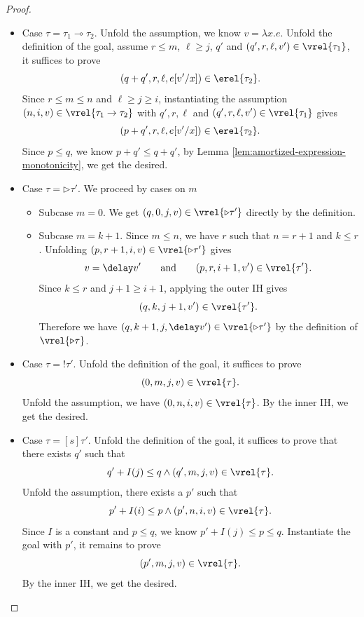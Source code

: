 \begin{proof}
\begin{itemize}
\begin{itemize}
\item {Subcase $v = \mathsf{inr}\,v_2$.}
The proof is symmetric to the first subcase.
\end{itemize}

\item Case $\tau = \tau_1\multimap\tau_2$.
Unfold the assumption, we know $v = \lambda x.e$. Unfold the definition of the goal, assume 
$r \leq m$, $\ell \geq j$, $q'$ and $(q',r, \ell, v') \in \vrel{\tau_1}$,
it suffices to prove 
\[(q+q',r, \ell, e[v'/x]) \in \erel{\tau_2}.\]
Since $r\leq m\leq n$ and $\ell\geq j\geq i$, instantiating the assumption $(n, i, v) \in \vrel{\tau_1 \to \tau_2}$ with
$q', r, \ell$ and $(q',r, \ell, v') \in \vrel{\tau_1}$ gives
\[(p+q',r, \ell, e[v'/x]) \in \erel{\tau_2}.\]
Since $p \leq q$, we know $p+q'\leq q+q'$, by Lemma \ref{lem:amortized-expression-monotonicity}, we get the desired.

\item Case $\tau=\triangleright\tau'$.
We proceed by cases on $m$

\begin{itemize}
\item {Subcase $m=0$.}
We get $(q, 0,j,v) \in \vrel{\triangleright\tau'}$ directly by the definition.

\item {Subcase $m=k+1$.}
Since $m \leq n$, we have $r$ such that
$n = r+1$ and $k \leq r$. Unfolding $(p, r+1, i, v) \in \vrel{\triangleright \tau'}$ gives
\[v = \delay v' \qquad\text{and} \qquad (p,r,i+1,v')\in\vrel{\tau'}.\]
Since $k \leq r$ and $j+1\geq i+1$, applying the outer IH gives
\[(q, k,j+1,v')\in\vrel{\tau'}.\]
Therefore we have $(q, k+1,j,\delay v') \in \vrel{\triangleright\tau'}$ by the definition of $\vrel{\triangleright \tau}$.
\end{itemize}

\item Case $\tau=!\tau'$. Unfold the definition of the goal, it suffices to prove
\[(0, m, j,v) \in \vrel{\tau}.\]
Unfold the assumption, we have $(0, n, i, v) \in \vrel{\tau}$.
By the inner IH, we get the desired.

\item Case $\tau=[s]\tau'$.
Unfold the definition of the goal, it suffices to prove that there exists $q'$ such that
\[q'+I(j) \leq q \land (q', m, j, v) \in \vrel{\tau}.\]
Unfold the assumption, there exists a $p'$ such that 
\[p'+ I(i) \leq p \land (p', n, i, v) \in \vrel{\tau}.\]
Since $I$ is a constant and $p \leq q$, we know $p' + I(j) \leq p \leq q$.
Instantiate the goal with $p'$, it remains to prove 
\[(p', m, j, v) \in \vrel{\tau}.\]
By the inner IH, we get the desired.


\end{itemize}
\end{proof}

